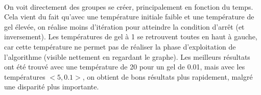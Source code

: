 \documentclass[12pt]{article}
\begin{document}
\paragraph{}On voit directement des groupes se créer, principalement en fonction du temps. Cela vient du fait qu'avec une température initiale faible et une température de gel élevée, on réalise moins d'itération pour atteindre la condition d'arrêt (et inversement). Les températures de gel à 1 se retrouvent toutes en haut à gauche, car cette température ne permet pas de réaliser la phase d'exploitation de l'algorithme (visible nettement en regardant le graphe). Les meilleurs résultats ont été trouvé avec une température de 20 pour un gel de 0.01, mais avec les températures $<5,0.1>$, on obtient de bons résultats plus rapidement, malgré une disparité plus importante.

\begin{figure}[!h]
\begin{floatrow}
\end{floatrow}
\end{figure}
\end{document}
